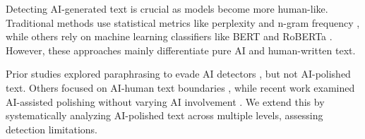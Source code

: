 
Detecting AI-generated text is crucial as models become more human-like. Traditional methods use statistical metrics like perplexity and n-gram frequency \citep{gehrmann2019gltr, wu2023llmdet, hans2024spotting}, while others rely on machine learning classifiers like BERT and RoBERTa \citep{hu2023radar, guo-etal-2023-hc3, solaiman2019release}. However, these approaches mainly differentiate pure AI and human-written text.


Prior studies explored paraphrasing to evade AI detectors \citep{sadasivan2023can, krishna2023paraphrasing}, but not AI-polished text. Others focused on AI-human text boundaries \citep{dugan2023real, zeng2024towards}, while recent work examined AI-assisted polishing without varying AI involvement \citep{gao2024llm, yang2024chatgpt}. We extend this by systematically analyzing AI-polished text across multiple levels, assessing detection limitations.